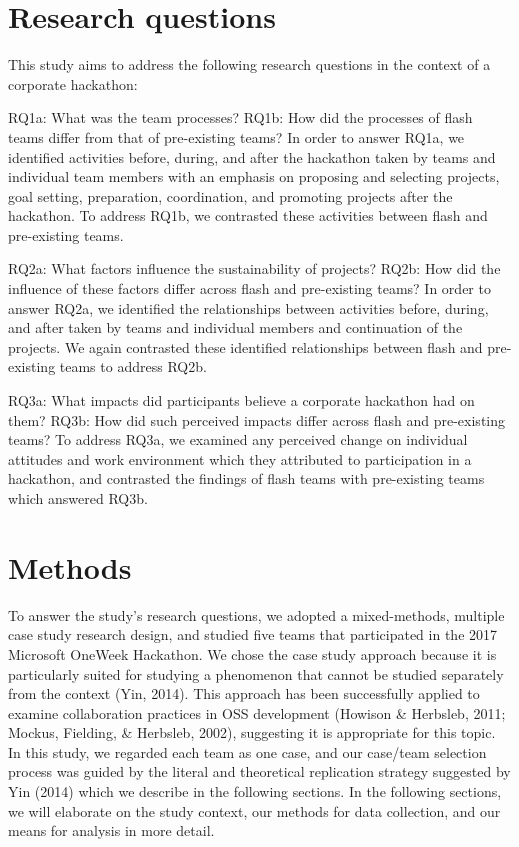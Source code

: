 \documentclass{hcij}
\begin{document}
\section{Research questions}
This study aims to address the following research questions in the context of a corporate hackathon:

RQ1a: What was the team processes?
RQ1b:	How did the processes of flash teams differ from that of pre-existing teams?
In order to answer RQ1a, we identified activities before, during, and after the hackathon taken by teams and individual team members with an emphasis on proposing and selecting projects, goal setting, preparation, coordination, and promoting projects after the hackathon. To address RQ1b, we contrasted these activities between flash and pre-existing teams.

RQ2a:	What factors influence the sustainability of projects?
RQ2b:	How did the influence of these factors differ across flash and pre-existing teams?
In order to answer RQ2a, we identified the relationships between activities before, during, and after taken by teams and individual members and continuation of the projects. We again contrasted these identified relationships between flash and pre-existing teams to address RQ2b.

RQ3a: What impacts did participants believe a corporate hackathon had on them?
RQ3b: How did such perceived impacts differ across flash and pre-existing teams?
To address RQ3a, we examined any perceived change on individual attitudes and work environment which they attributed to participation in a hackathon, and contrasted the findings of flash teams with pre-existing teams which answered RQ3b.

\section{Methods}
To answer the study’s research questions, we adopted a mixed-methods, multiple case study research design, and studied five teams that participated in the 2017 Microsoft OneWeek Hackathon. We chose the case study approach because it is particularly suited for studying a phenomenon that cannot be studied separately from the context (Yin, 2014). This approach has been successfully applied to examine collaboration practices in OSS development (Howison & Herbsleb, 2011; Mockus, Fielding, & Herbsleb, 2002), suggesting it is appropriate for this topic. In this study, we regarded each team as one case, and our case/team selection process was guided by the literal and theoretical replication strategy suggested by Yin (2014) which we describe in the following sections. In the following sections, we will elaborate on the study context, our methods for data collection, and our means for analysis in more detail.
\end{document}

